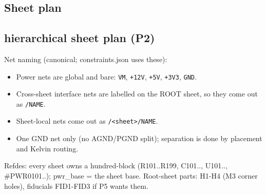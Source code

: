 \documentclass[11pt,a4paper]{article}
\begin{document}
\subsection*{Sheet plan}
\subsection*{hierarchical sheet plan (P2)}
Net naming (canonical; constraints.json uses these):

\begin{itemize}
\item Power nets are global and bare: \texttt{VM}, \texttt{+12V}, \texttt{+5V}, \texttt{+3V3}, \texttt{GND}.
\item Cross-sheet interface nets are labelled on the ROOT sheet, so they come out as \texttt{/NAME}.
\item Sheet-local nets come out as \texttt{/\textless{}sheet\textgreater{}/NAME}.
\item One GND net only (no AGND/PGND split); separation is done by placement and Kelvin routing.
\end{itemize}
Refdes: every sheet owns a hundred-block (R101..R199, C101.., U101.., \#PWR0101..); pwr\_base = the sheet base. Root-sheet parts: H1-H4 (M3 corner holes), fiducials FID1-FID3 if P5 wants them.
\end{document}
